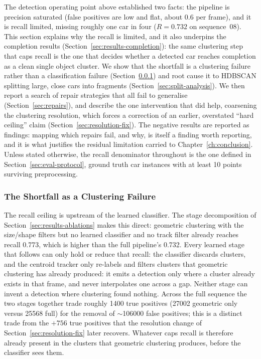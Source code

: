\documentclass[a4paper,12pt]{report}
\begin{document}
The detection operating point above established two facts: the pipeline is
precision saturated (false positives are low and flat, about \num{0.6} per frame),
and it is recall limited, missing roughly one car in four
($R=\num{0.732}$ on sequence~08). This section explains why the recall is
limited, and it also underpins the completion results
(Section~\ref{sec:results-completion}): the same clustering step that caps recall
is the one that decides whether a detected car reaches completion as a clean
single object cluster. We show that the shortfall is
a clustering failure rather than a classification failure
(Section~\ref{sec:recall-diagnosis}) and root cause it to HDBSCAN splitting large,
close cars into fragments (Section~\ref{sec:split-analysis}). We then report a search of
repair strategies that all fail to generalise (Section~\ref{sec:repairs}), and
describe the one intervention that did help, coarsening the clustering
resolution, which forces a correction of an earlier, overstated ``hard
ceiling'' claim (Section~\ref{sec:resolution-fix}). The negative results are
reported as findings: mapping which repairs fail, and why, is
itself a finding worth reporting, and it is what justifies the residual limitation carried to
Chapter~\ref{ch:conclusion}. Unless stated otherwise, the recall denominator
throughout is the one defined in Section~\ref{sec:eval-protocol}, ground truth
car instances with at least \num{10} points surviving preprocessing.

\subsubsection{The Shortfall as a Clustering Failure}
\label{sec:recall-diagnosis}

The recall ceiling is upstream of the learned classifier. The stage decomposition
of Section~\ref{sec:results-ablations} makes this direct: geometric clustering with the
size/shape filters but no learned classifier and no track filter
already reaches recall \num{0.773}, which is higher than the full pipeline's
\num{0.732}. Every learned stage that follows can only hold or reduce that recall:
the classifier discards clusters, and the centroid tracker only re-labels and
filters clusters that geometric clustering has already produced: it emits a
detection only where a cluster already exists in that frame, and never
interpolates one across a gap. Neither stage can invent a detection where clustering
found nothing. Across the full sequence the two stages together trade roughly
\num{1400} true positives (\num{27002} geometric only versus \num{25568} full) for the removal of $\sim$\num{106000} false positives; this is a
distinct trade from the $+\num{756}$ true positives that the resolution change of
Section~\ref{sec:resolution-fix} later recovers. Whatever caps recall is therefore
already present in the clusters that geometric clustering produces, before the
classifier sees them.
\end{document}
